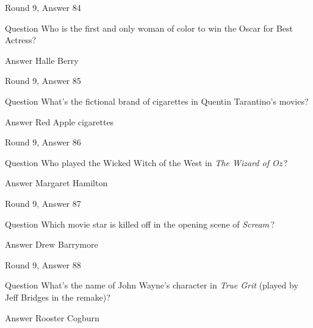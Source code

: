 \documentclass[11pt]{beamer}
\begin{document}
\begin{frame}[t]{Round 9, Answer 84}
\vspace{2em}
\begin{block}{Question}
Who is the first and only woman of color to win the Oscar for Best Actress?
\end{block}
\pause{}
\begin{block}{Answer}
Halle Berry
\end{block}
\end{frame}
    

\begin{frame}[t]{Round 9, Answer 85}
\vspace{2em}
\begin{block}{Question}
What's the fictional brand of cigarettes in Quentin Tarantino's movies?
\end{block}
\pause{}
\begin{block}{Answer}
Red Apple cigarettes
\end{block}
\end{frame}
    

\begin{frame}[t]{Round 9, Answer 86}
\vspace{2em}
\begin{block}{Question}
Who played the Wicked Witch of the West in \emph{The Wizard of Oz}\,?
\end{block}
\pause{}
\begin{block}{Answer}
Margaret Hamilton
\end{block}
\end{frame}
    

\begin{frame}[t]{Round 9, Answer 87}
\vspace{2em}
\begin{block}{Question}
Which movie star is killed off in the opening scene of \emph{Scream}\,?
\end{block}
\pause{}
\begin{block}{Answer}
Drew Barrymore
\end{block}
\end{frame}
    

\begin{frame}[t]{Round 9, Answer 88}
\vspace{2em}
\begin{block}{Question}
What's the name of John Wayne's character in \emph{True Grit} (played by Jeff Bridges in the remake)?
\end{block}
\pause{}
\begin{block}{Answer}
Rooster Cogburn
\end{block}
\end{frame}
    
\end{document}
